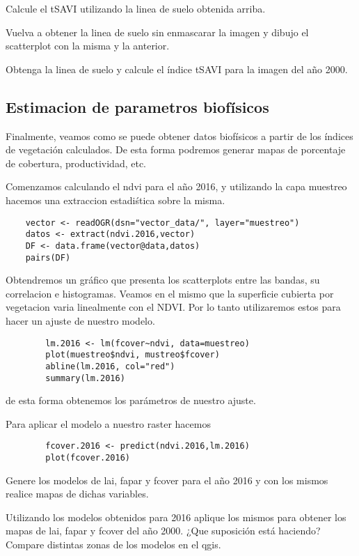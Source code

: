 \begin{act}
    Calcule el tSAVI utilizando la linea de suelo obtenida arriba.
\end{act}

\begin{act}
    Vuelva a obtener la linea de suelo sin enmascarar la imagen y dibujo el
    scatterplot con la misma y la anterior.
\end{act}

\begin{act}
    Obtenga la linea de suelo y calcule el \'indice tSAVI para la imagen del año
    2000.
\end{act}

\subsection{Estimacion de parametros biof\'isicos}

Finalmente, veamos como se puede obtener datos biof\'isicos a partir de los
\'indices de vegetaci\'on calculados. De esta forma podremos generar mapas de
porcentaje de cobertura, productividad, etc.

\begin{exa}
    Comenzamos calculando el ndvi para el año 2016, y utilizando la capa
    muestreo hacemos una extraccion estadi\'stica sobre la misma.
    \begin{lstlisting}
    vector <- readOGR(dsn="vector_data/", layer="muestreo")
    datos <- extract(ndvi.2016,vector)
    DF <- data.frame(vector@data,datos)
    pairs(DF)
    \end{lstlisting}

    Obtendremos un gr\'afico que presenta los scatterplots entre las bandas, su
    correlacion e histogramas.
    Veamos en el mismo que la superficie cubierta por vegetacion varia
    linealmente con el NDVI\@. Por lo tanto utilizaremos estos para hacer un
    ajuste de nuestro modelo.
    \begin{lstlisting}
        lm.2016 <- lm(fcover~ndvi, data=muestreo)
        plot(muestreo$ndvi, mustreo$fcover)
        abline(lm.2016, col="red")
        summary(lm.2016)
    \end{lstlisting}
    de esta forma obtenemos los par\'ametros de nuestro ajuste.

    Para aplicar el modelo a nuestro raster hacemos
    \begin{lstlisting}
        fcover.2016 <- predict(ndvi.2016,lm.2016)
        plot(fcover.2016)
    \end{lstlisting}
\end{exa}

\begin{act}
    Genere los modelos de lai, fapar y fcover para el año 2016 y con los mismos
    realice mapas de dichas variables.
\end{act}

\begin{act}
    Utilizando los modelos obtenidos para 2016 aplique los mismos para obtener
    los mapas de lai, fapar y fcover del año 2000. ¿Que suposici\'on est\'a
    haciendo? Compare distintas zonas de los modelos en el qgis.
\end{act}
